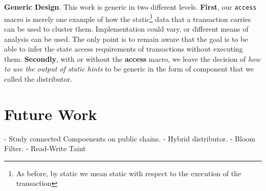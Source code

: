 \textbf{Generic Design}. This work is generic in two different levels. \textbf{First}, our
\texttt{access} macro is merely one example of how the static\footnote{As before, by static we mean
static with respect to the execution of the transaction} data that a transaction carries can be used
to cluster them. Implementation could vary, or different means of analysis can be used. The only
point is to remain aware that the goal is to be able to infer the state access requirements of
transactions without executing them. \textbf{Secondly}, with or without the \textbf{access} macro,
we leave the decision of \textit{how to use the output of static hints} to be generic in the form of
component that we called the distributor.

\section{Future Work}

- Study connected Compoenents on public chains.
- Hybrid distributor.
- Bloom Filter.
- Read-Write Taint
